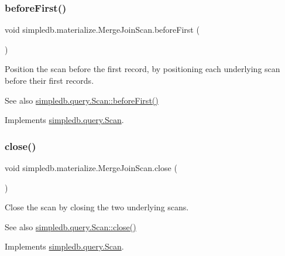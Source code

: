 \subsubsection{\texorpdfstring{before\+First()}{beforeFirst()}}
{\footnotesize\ttfamily void simpledb.\+materialize.\+Merge\+Join\+Scan.\+before\+First (\begin{DoxyParamCaption}{ }\end{DoxyParamCaption})\hspace{0.3cm}{\ttfamily [inline]}}

Position the scan before the first record, by positioning each underlying scan before their first records. \begin{DoxySeeAlso}{See also}
\hyperlink{interfacesimpledb_1_1query_1_1Scan_a2eceb634b69da9bf1269a4355808cc6b}{simpledb.\+query.\+Scan\+::before\+First()} 
\end{DoxySeeAlso}


Implements \hyperlink{interfacesimpledb_1_1query_1_1Scan_a2eceb634b69da9bf1269a4355808cc6b}{simpledb.\+query.\+Scan}.

\mbox{\label{classsimpledb_1_1materialize_1_1MergeJoinScan_a11fc3e14ebf559089454871786acf1fe}} 
\subsubsection{\texorpdfstring{close()}{close()}}
{\footnotesize\ttfamily void simpledb.\+materialize.\+Merge\+Join\+Scan.\+close (\begin{DoxyParamCaption}{ }\end{DoxyParamCaption})\hspace{0.3cm}{\ttfamily [inline]}}

Close the scan by closing the two underlying scans. \begin{DoxySeeAlso}{See also}
\hyperlink{interfacesimpledb_1_1query_1_1Scan_a260f40a8c82edaa00398bea9d698933c}{simpledb.\+query.\+Scan\+::close()} 
\end{DoxySeeAlso}


Implements \hyperlink{interfacesimpledb_1_1query_1_1Scan_a260f40a8c82edaa00398bea9d698933c}{simpledb.\+query.\+Scan}.

\mbox{\label{classsimpledb_1_1materialize_1_1MergeJoinScan_aa1cf26813dd8eedf72edf094d257648f}} 
